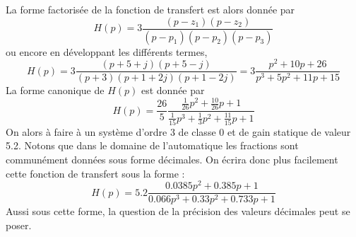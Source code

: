 La forme factorisée de la fonction de transfert est alors donnée par 
\[
    H(p)=3\dfrac{(p-z_1)(p-z_2)}{(p-p_1)(p-p_2)(p-p_3)}
\]
ou encore en développant les différents termes,
\[
    H(p)=3\dfrac{(p+5+j)(p+5-j)}{(p+3)(p+1+2j)(p+1-2j)}
        =3\dfrac{p^2+10p+26}{p^3+5p^2+11p+15}
\]
La forme canonique de $H(p)$ est donnée par 
\[
    H(p)=\dfrac{26}{5}\dfrac{\frac{1}{26}p^2+\frac{10}{26}p+1}
                            {\frac{1}{15}p^3+\frac{1}{3}p^2+\frac{11}{15}p+1}
\]
On alors à faire à un système d'ordre 3 de classe 0 et de gain statique 
de valeur 5.2. 
Notons que dans le domaine de l'automatique les fractions sont communément
données sous forme décimales. On écrira donc plus facilement cette fonction
de transfert sous la forme :
\[
    H(p)=5.2\dfrac{0.0385p^2+0.385p+1}{0.066p^3+0.33p^2+0.733p+1}
\]
Aussi sous cette forme, la question de la précision des valeurs décimales 
peut se poser. 
